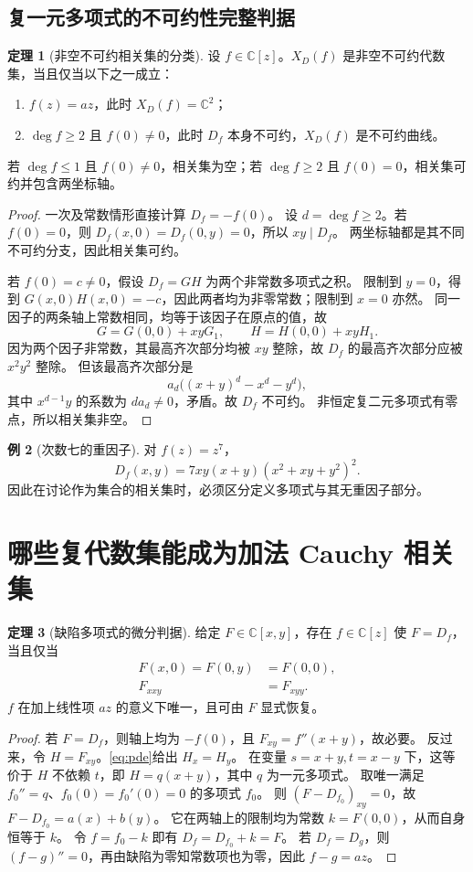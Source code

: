 \documentclass[UTF8,11pt,a4paper]{ctexart}
\theoremstyle{definition}
\newtheorem{theorem}{定理}[section]
\newtheorem{example}[theorem]{例}
\newcommand{\C}{\mathbb C}
\begin{document}
\subsection{复一元多项式的不可约性完整判据}
\begin{theorem}[非空不可约相关集的分类]\label{thm:irreducible}
设 $f\in\C[z]$。$X_D(f)$ 是非空不可约代数集，当且仅当以下之一成立：
\begin{enumerate}
\item $f(z)=az$，此时 $X_D(f)=\C^2$；
\item $\deg f\ge2$ 且 $f(0)\ne0$，此时 $D_f$ 本身不可约，$X_D(f)$ 是不可约曲线。
\end{enumerate}
若 $\deg f\le1$ 且 $f(0)\ne0$，相关集为空；若 $\deg f\ge2$ 且 $f(0)=0$，相关集可约并包含两坐标轴。
\end{theorem}
\begin{proof}
一次及常数情形直接计算 $D_f=-f(0)$。
设 $d=\deg f\ge2$。若 $f(0)=0$，则 $D_f(x,0)=D_f(0,y)=0$，所以 $xy\mid D_f$。
两坐标轴都是其不同不可约分支，因此相关集可约。

若 $f(0)=c\ne0$，假设 $D_f=GH$ 为两个非常数多项式之积。
限制到 $y=0$，得到 $G(x,0)H(x,0)=-c$，因此两者均为非零常数；限制到 $x=0$ 亦然。
同一因子的两条轴上常数相同，均等于该因子在原点的值，故
\[
 G=G(0,0)+xyG_1,\qquad H=H(0,0)+xyH_1.
\]
因为两个因子非常数，其最高齐次部分均被 $xy$ 整除，故 $D_f$ 的最高齐次部分应被 $x^2y^2$ 整除。
但该最高齐次部分是
\[
 a_d\bigl((x+y)^d-x^d-y^d\bigr),
\]
其中 $x^{d-1}y$ 的系数为 $d a_d\ne0$，矛盾。故 $D_f$ 不可约。
非恒定复二元多项式有零点，所以相关集非空。
\end{proof}

\begin{example}[次数七的重因子]
对 $f(z)=z^7$，
\[
 D_f(x,y)=7xy(x+y)(x^2+xy+y^2)^2.
\]
因此在讨论作为集合的相关集时，必须区分定义多项式与其无重因子部分。
\end{example}

\section{哪些复代数集能成为加法 Cauchy 相关集}\label{sec:realization}
\begin{theorem}[缺陷多项式的微分判据]\label{thm:diffcriterion}
给定 $F\in\C[x,y]$，存在 $f\in\C[z]$ 使 $F=D_f$，当且仅当
\begin{align}
 F(x,0)=F(0,y)&=F(0,0),\label{eq:axes}\\
 F_{xxy}&=F_{xyy}.\label{eq:pde}
\end{align}
$f$ 在加上线性项 $az$ 的意义下唯一，且可由 $F$ 显式恢复。
\end{theorem}
\begin{proof}
若 $F=D_f$，则轴上均为 $-f(0)$，且 $F_{xy}=f''(x+y)$，故必要。
反过来，令 $H=F_{xy}$。\eqref{eq:pde}给出 $H_x=H_y$。
在变量 $s=x+y,t=x-y$ 下，这等价于 $H$ 不依赖 $t$，即 $H=q(x+y)$，其中 $q$ 为一元多项式。
取唯一满足 $f_0''=q$、$f_0(0)=f_0'(0)=0$ 的多项式 $f_0$。
则 $(F-D_{f_0})_{xy}=0$，故 $F-D_{f_0}=a(x)+b(y)$。
它在两轴上的限制均为常数 $k=F(0,0)$，从而自身恒等于 $k$。
令 $f=f_0-k$ 即有 $D_f=D_{f_0}+k=F$。
若 $D_f=D_g$，则 $(f-g)''=0$，再由缺陷为零知常数项也为零，因此 $f-g=az$。
\end{proof}
\end{document}
